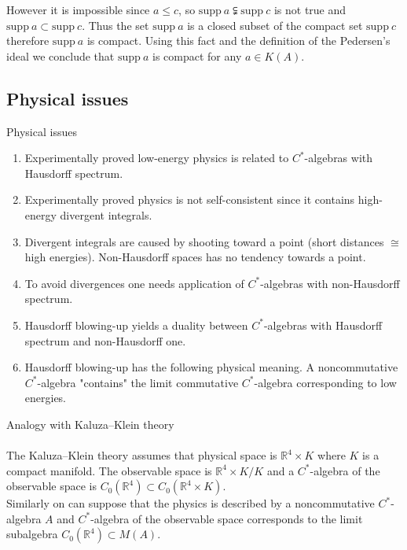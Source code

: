 \documentclass{beamer}
\theoremstyle{plain}
\newcommand{\Rb}{\mathbb{R}}
\newcommand{\supp}{\mathrm{supp}}
\begin{document}
\begin{frame}
However it is impossible since $a \le c$, so $\supp~ a \subsetneqq \supp ~c$ is not true and $\supp ~a \subset\supp ~c$. Thus the set $\supp~ a$ is a closed subset of the compact set $\supp~ c$ therefore $\supp~ a$ is compact. Using this fact and the definition of the Pedersen's ideal we conclude that $\supp~ a$ is compact for any $a \in K\left( A\right)$. 
	
	
\end{frame}
\begin{frame}
\section{Physical issues}
\huge{Physical issues} \normalsize
$~$\\
\begin{enumerate}
	\item 	Experimentally proved low-energy physics is related to $C^*$-algebras with Hausdorff spectrum.
	\item 		Experimentally proved physics is not self-consistent since it contains high-energy  divergent integrals.
	\item Divergent integrals are caused by shooting toward a point (short distances $\cong$ high energies). Non-Hausdorff spaces has no tendency towards a point.
	\item To avoid divergences one needs application of $C^*$-algebras with non-Hausdorff spectrum.
	\item Hausdorff blowing-up yields a duality between $C^*$-algebras with Hausdorff spectrum and non-Hausdorff one.
	\item Hausdorff blowing-up has the following physical meaning. A noncommutative $C^*$-algebra "contains" the \alert{limit} commutative $C^*$-algebra corresponding to low energies.
\end{enumerate}
\end{frame}
\begin{frame}
	\huge{Analogy with Kaluza–Klein theory} \normalsize
	$~$\\
	$~$\\
The Kaluza–Klein theory assumes that physical space  is $\Rb^4 \times K$ where $K$ is a compact manifold. The \alert{observable  space} is $\Rb^4 \times K/K$ and a $C^*$-algebra of the  \alert{observable  space}  is $C_0\left(\Rb^4 \right) \subset C_0\left(\Rb^4 \times K\right)$.
\\
Similarly on can suppose that the physics is described by a noncommutative $C^*$-algebra $A$ and  $C^*$-algebra of the  \alert{observable  space}  corresponds to the \alert{limit subalgebra} $C_0\left( \Rb^4\right) \subset M\left( A\right)$.
	
	\end{frame}
\end{document}
